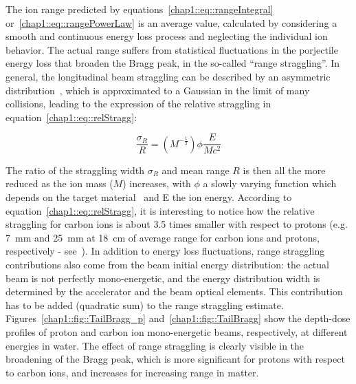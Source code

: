  
The ion range predicted by equations~\ref{chap1::eq::rangeIntegral} or~\ref{chap1::eq::rangePowerLaw}  is an average value, calculated by considering a smooth and continuous energy loss process and neglecting the individual ion behavior. The actual range suffers from statistical fluctuations in the porjectile energy loss that broaden the Bragg peak, in the so-called \enquote{range straggling}. In general, the longitudinal beam straggling can be described by an asymmetric distribution~\parencite{Vavilov1957}, which is approximated to a Gaussian in the limit of many collisions, leading to the expression of the relative straggling in equation~\ref{chap1::eq::relStragg}:
 
 \begin{equation}
\frac{\sigma_{R}}{R} = (M^{-\frac{1}{2}})\phi\frac{E}{Mc^{2}}
\label{chap1::eq::relStragg}
\end{equation}

The ratio of the straggling width $\sigma_{R}$ and mean range $R$ is then all the more reduced as the ion mass ($M$) increases, with $\phi$ a slowly varying function which depends on the target material~\parencite{Rossi1952} and E the ion energy. According to equation~\ref{chap1::eq::relStragg}, it is interesting to notice how the relative straggling for carbon ions is about 3.5 times smaller with respect to protons (e.g. 7~mm and 25~mm at 18~cm of average range for carbon ions and protons, respectively - see~\cite{Durante2016}). In addition to energy loss fluctuations, range straggling contributions also come from the beam initial energy distribution: the actual beam is not perfectly mono-energetic, and the energy distribution width is determined by the accelerator and the beam optical elements. This contribution has to be added (quadratic sum) to the range straggling estimate. Figures~\ref{chap1::fig::TailBragg_p} and~\ref{chap1::fig::TailBragg} show the depth-dose profiles of proton and carbon ion mono-energetic beams, respectively, at different energies in water. The effect of range straggling is clearly visible in the broadening of the Bragg peak, which is more significant for protons with respect to carbon ions, and increases for increasing range in matter.  

